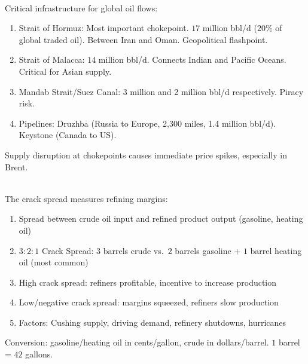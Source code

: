 \documentclass[a4paper,oneside,openany]{book}
\begin{document}
\begin{remark} \\
Critical infrastructure for global oil flows:
\begin{enumerate}[label=\roman*.]
\setlength{\itemsep}{0pt}
\item Strait of Hormuz: Most important chokepoint. $17$ million bbl/d ($20\%$ of global traded oil). Between Iran and Oman. Geopolitical flashpoint.
\item Strait of Malacca: $14$ million bbl/d. Connects Indian and Pacific Oceans. Critical for Asian supply.
\item Mandab Strait/Suez Canal: 3 million and 2 million bbl/d respectively. Piracy risk.
\item Pipelines: Druzhba (Russia to Europe, 2,300 miles, 1.4 million bbl/d). Keystone (Canada to US).
\end{enumerate}
Supply disruption at chokepoints causes immediate price spikes, especially in Brent.
\end{remark}

\begin{remark} \\
The crack spread measures refining margins:
\begin{enumerate}[label=\roman*.]
\setlength{\itemsep}{0pt}
\item Spread between crude oil input and refined product output (gasoline, heating oil)
\item $3:2:1$ Crack Spread: $3$ barrels crude vs.\ $2$ barrels gasoline + $1$ barrel heating oil (most common)
\item High crack spread: refiners profitable, incentive to increase production
\item Low/negative crack spread: margins squeezed, refiners slow production
\item Factors: Cushing supply, driving demand, refinery shutdowns, hurricanes
\end{enumerate}
Conversion: gasoline/heating oil in cents/gallon, crude in dollars/barrel. $1$ barrel = $42$ gallons.
\end{remark}
\end{document}
